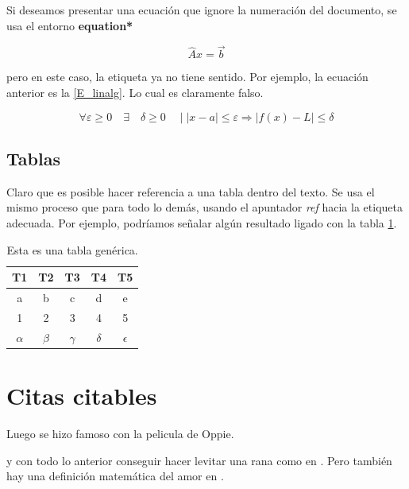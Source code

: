\documentclass[a4paper]{article}
\begin{document}
Si deseamos presentar una ecuación que ignore la numeración 
del documento, se usa el entorno \textbf{equation*}

\begin{equation*}
    \label{E_linalg}
    \hat{A} x = \vec{b}
\end{equation*}

pero en este caso, la etiqueta ya no tiene sentido. 
Por ejemplo, la ecuación anterior es la \ref{E_linalg}. Lo 
cual es claramente falso.

\begin{equation}
    \forall \varepsilon \geq 0 \quad 
    \exists \quad \delta \geq 0 \quad \mid 
    |x - a | \leq \varepsilon \Rightarrow  
    |f(x) -L| \leq \delta 
\end{equation}

\newpage
\subsection{Tablas}

Claro que es posible hacer referencia a una tabla dentro 
del texto. Se usa el mismo proceso que para todo lo demás, 
usando el apuntador \textit{ref} hacia la etiqueta adecuada. 
Por ejemplo, podríamos señalar algún resultado ligado con 
la tabla \ref{T_generica}.

\begin{table}[ht]
\centering
\caption{Esta es una tabla genérica.}
\begin{tabular}{|c|c|c|c|c|}
\hline
 T1 & T2  & T3  & T4  & T5  \\ \hline
 a  & b   & c   &  d  & e   \\ \hline
 1  & 2   & 3   &  4  & 5 \\ \hline 
 $\alpha$ & $\beta$  & $\gamma$  & $\delta$  & $\epsilon$  \\ \hline 
\end{tabular}
\label{T_generica}
\end{table}


\section{Citas citables}

Luego \cite{Feynman64} se hizo famoso con la pelicula 
de Oppie.

y con todo lo anterior conseguir hacer levitar una 
rana como en \cite{Simon2000}. Pero también hay una
definición matemática del amor en \cite{Alstola2022}.


\newpage

\cite{*}
\end{document}
